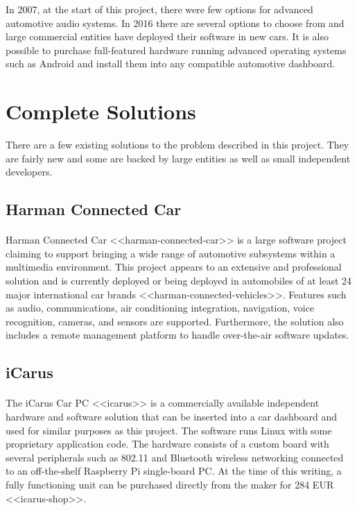 In 2007, at the start of this project, there were few options for advanced automotive audio systems.
In 2016 there are several options to choose from and large commercial entities have deployed their software in new cars.
It is also possible to purchase full-featured hardware running advanced operating systems such as Android and install them into any compatible automotive dashboard.

\section{Complete Solutions}

There are a few existing solutions to the problem described in this project.
They are fairly new and some are backed by large entities as well as small independent developers.

\subsection{Harman Connected Car}

\paragraph{}
Harman Connected Car <<harman-connected-car>> is a large software project claiming to support bringing a wide range of automotive subsystems within a multimedia environment.
This project appears to an extensive and professional solution and is currently deployed or being deployed in automobiles of at least 24 major international car brands <<harman-connected-vehicles>>.
Features such as audio, communications, air conditioning integration, navigation, voice recognition, cameras, and sensors are supported.
Furthermore, the solution also includes a remote management platform to handle over-the-air software updates.

\subsection{iCarus}

\paragraph{}
The iCarus Car PC <<icarus>> is a commercially available independent  hardware and software solution that can be inserted into a car dashboard and used for similar purposes as this project.
The software runs Linux with some proprietary application code.
The hardware consists of a custom board with several peripherals such as 802.11 and Bluetooth wireless networking connected to an off-the-shelf Raspberry Pi single-board PC.
At the time of this writing, a fully functioning unit can be purchased directly from the maker for 284 EUR <<icarus-shop>>.

